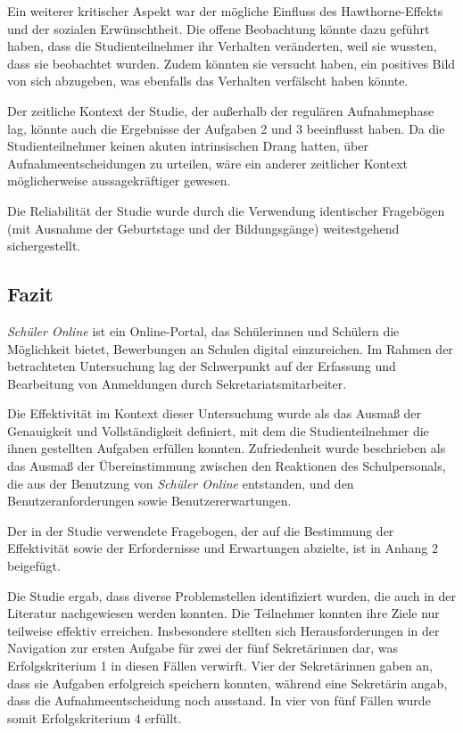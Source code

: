 Ein weiterer kritischer Aspekt war der mögliche Einfluss des Hawthorne-Effekts und der sozialen Erwünschtheit. Die offene Beobachtung könnte dazu geführt haben, dass die Studienteilnehmer ihr Verhalten veränderten, weil sie wussten, dass sie beobachtet wurden. Zudem könnten sie versucht haben, ein positives Bild von sich abzugeben, was ebenfalls das Verhalten verfälscht haben könnte.

Der zeitliche Kontext der Studie, der außerhalb der regulären Aufnahmephase lag, könnte auch die Ergebnisse der Aufgaben 2 und 3 beeinflusst haben. Da die Studienteilnehmer keinen akuten intrinsischen Drang hatten, über Aufnahmeentscheidungen zu urteilen, wäre ein anderer zeitlicher Kontext möglicherweise aussagekräftiger gewesen.

Die Reliabilität der Studie wurde durch die Verwendung identischer Fragebögen (mit Ausnahme der Geburtstage und der Bildungsgänge) weitestgehend sichergestellt.

\subsection{Fazit}

\textit{Schüler Online} ist ein Online-Portal, das Schülerinnen und Schülern die Möglichkeit bietet, Bewerbungen an Schulen digital einzureichen. Im Rahmen der betrachteten Untersuchung lag der Schwerpunkt auf der Erfassung und Bearbeitung von Anmeldungen durch Sekretariatsmitarbeiter.

Die Effektivität im Kontext dieser Untersuchung wurde als das Ausmaß der Genauigkeit und Vollständigkeit definiert, mit dem die Studienteilnehmer die ihnen gestellten Aufgaben erfüllen konnten. Zufriedenheit wurde beschrieben als das Ausmaß der Übereinstimmung zwischen den Reaktionen des Schulpersonals, die aus der Benutzung von \textit{Schüler Online} entstanden, und den Benutzeranforderungen sowie Benutzererwartungen.

Der in der Studie verwendete Fragebogen, der auf die Bestimmung der Effektivität sowie der Erfordernisse und Erwartungen abzielte, ist in Anhang 2 beigefügt.

Die Studie ergab, dass diverse Problemstellen identifiziert wurden, die auch in der Literatur nachgewiesen werden konnten. Die Teilnehmer konnten ihre Ziele nur teilweise effektiv erreichen. Insbesondere stellten sich Herausforderungen in der Navigation zur ersten Aufgabe für zwei der fünf Sekretärinnen dar, was Erfolgskriterium 1 in diesen Fällen verwirft. Vier der Sekretärinnen gaben an, dass sie Aufgaben erfolgreich speichern konnten, während eine Sekretärin angab, dass die Aufnahmeentscheidung noch ausstand. In vier von fünf Fällen wurde somit Erfolgskriterium 4 erfüllt.

